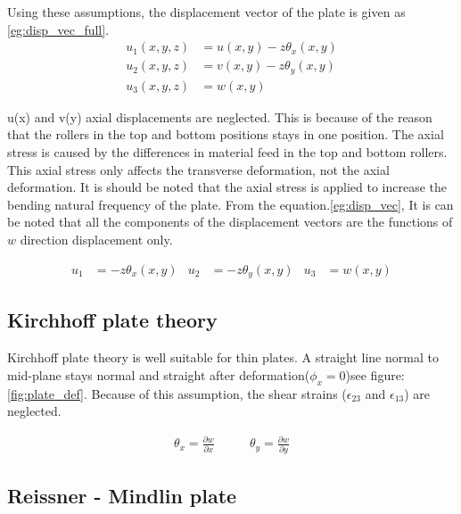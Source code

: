 \documentclass[main.tex]{subfiles}
\begin{document}
 Using these assumptions, the displacement vector of the plate is given as \ref{eg:disp_vec_full}.
\begin{equation}\label{eg:disp_vec_full}
 \begin{split}
u_1 \left( x, y ,z\right) & =  u \left( x ,y\right) - z \theta_x \left(x,y\right) \\
u_2 \left( x, y ,z\right) & =  v \left( x, y \right) - z \theta_y \left(x,y\right)\\
u_3 \left( x, y ,z\right) & =  w \left(x, y \right) 
\end{split}
\end{equation}

 u(x) and v(y) axial displacements are  neglected. This is because of the reason that the rollers in the top and bottom positions stays in one position. The axial stress is caused by the differences in material feed in the top and bottom rollers. This axial stress only affects the transverse deformation, not the axial deformation. It is should be noted that the axial stress is applied to increase the bending natural frequency of the plate. From the equation.\ref{eg:disp_vec}, It is can be noted that all the components of the displacement vectors are the functions of $w$ direction displacement only. 

\begin{align}\label{eg:disp_vec}
u_1  & =  - z \theta_x \left(x,y\right) &
u_2  & =  - z \theta_y \left(x,y\right) &
u_3  & =  w \left(x, y \right) 
\end{align}

 
 \subsection{Kirchhoff plate theory}
 
 Kirchhoff plate theory is well suitable for thin plates. A straight line normal to mid-plane stays normal and straight after deformation($\phi_x=0$)see figure:\ref{fig:plate_def}.  Because of this assumption, the shear strains ($\epsilon_{23}$ and $ \epsilon_{13}$)  are neglected.


\begin{align}
\theta_x  = \frac{\partial w }{\partial x}  \quad & \quad
\theta_y  = \frac{\partial w }{\partial y} 
\end{align}



\subsection{Reissner - Mindlin plate}
\end{document}
